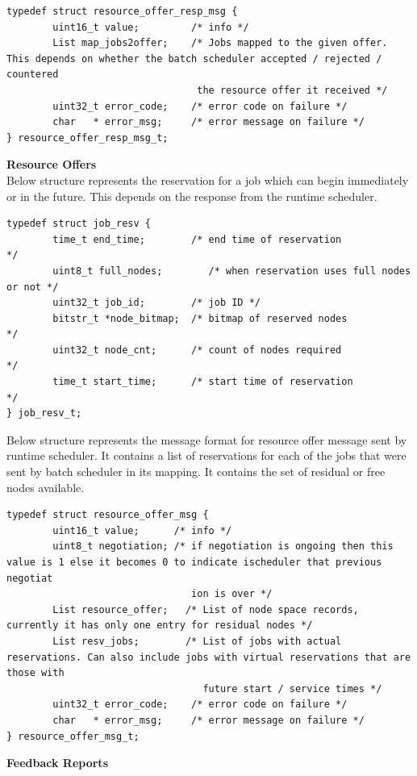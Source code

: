 \begin{lstlisting}[mathescape]
typedef struct resource_offer_resp_msg {
        uint16_t value;         /* info */
        List map_jobs2offer;    /* Jobs mapped to the given offer. This depends on whether the batch scheduler accepted / rejected / countered
                                 the resource offer it received */
        uint32_t error_code;    /* error code on failure */
        char   * error_msg;     /* error message on failure */
} resource_offer_resp_msg_t;
\end{lstlisting}
\textbf{Resource Offers}\\
Below structure represents the reservation for a job which can begin immediately or in the future. This depends on the response from the runtime scheduler.
\begin{lstlisting}[mathescape]
typedef struct job_resv {
        time_t end_time;        /* end time of reservation              */
        uint8_t full_nodes;        /* when reservation uses full nodes or not */
        uint32_t job_id;        /* job ID */
        bitstr_t *node_bitmap;  /* bitmap of reserved nodes             */
        uint32_t node_cnt;      /* count of nodes required              */
        time_t start_time;      /* start time of reservation            */
} job_resv_t;
\end{lstlisting}
Below structure represents the message format for resource offer message sent by runtime scheduler. It contains a list of reservations for each of the jobs that were sent by batch scheduler in its mapping. It contains the set of residual or free nodes available.
\begin{lstlisting}[mathescape]
typedef struct resource_offer_msg {
        uint16_t value;      /* info */
        uint8_t negotiation; /* if negotiation is ongoing then this value is 1 else it becomes 0 to indicate ischeduler that previous negotiat
                                ion is over */
        List resource_offer;   /* List of node space records, currently it has only one entry for residual nodes */
        List resv_jobs;        /* List of jobs with actual reservations. Can also include jobs with virtual reservations that are those with
                                  future start / service times */
        uint32_t error_code;    /* error code on failure */
        char   * error_msg;     /* error message on failure */
} resource_offer_msg_t;
\end{lstlisting}
\textbf{Feedback Reports}\\
